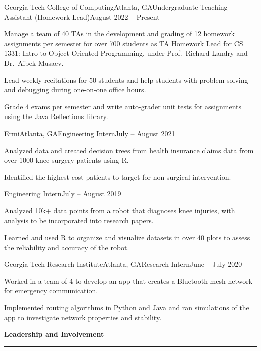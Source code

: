 \documentclass{article}
\newcommand{\horizontal}{\vspace{2pt}\hrule}
\newcommand{\sectitle}[1]{\vspace{3pt} \textbf{\large #1} \horizontal}
\begin{document}
\begin{flushleft}
    \begin{experience}{Georgia Tech College of Computing}{Atlanta, GA}{Undergraduate Teaching Assistant (Homework Lead)}{August 2022 -- Present}
        \item Manage a team of 40 TAs in the development and grading of 12 homework assignments per semester for over 700 students as TA Homework Lead for CS 1331: Intro to Object-Oriented Programming, under Prof.~Richard Landry and Dr.~Aibek Musaev.
        \item Lead weekly recitations for 50 students and help students with problem-solving and debugging during one-on-one office hours.
        \item Grade 4 exams per semester and write auto-grader unit tests for assignments using the Java Reflections library.
    \end{experience}

    \begin{experience}{Ermi}{Atlanta, GA}{Engineering Intern}{July -- August 2021}
        \item Analyzed data and created decision trees from health insurance claims data from over 1000 knee surgery patients using R.
        \item Identified the highest cost patients to target for non-surgical intervention.
    \end{experience}
    \begin{subexperience}{Engineering Intern}{July -- August 2019}
        \item Analyzed 10k+ data points from a robot that diagnoses knee injuries, with analysis to be incorporated into research papers.
        \item Learned and used R to organize and visualize datasets in over 40 plots to assess the reliability and accuracy of the robot.
    \end{subexperience}

    \begin{experience}{Georgia Tech Research Institute}{Atlanta, GA}{Research Intern}{June -- July 2020}
        \item Worked in a team of 4 to develop an app that creates a Bluetooth mesh network for emergency communication.
        \item Implemented routing algorithms in Python and Java and ran simulations of the app to investigate network properties and stability.
    \end{experience}

\sectitle{Leadership and Involvement}


\end{flushleft}
\end{document}
